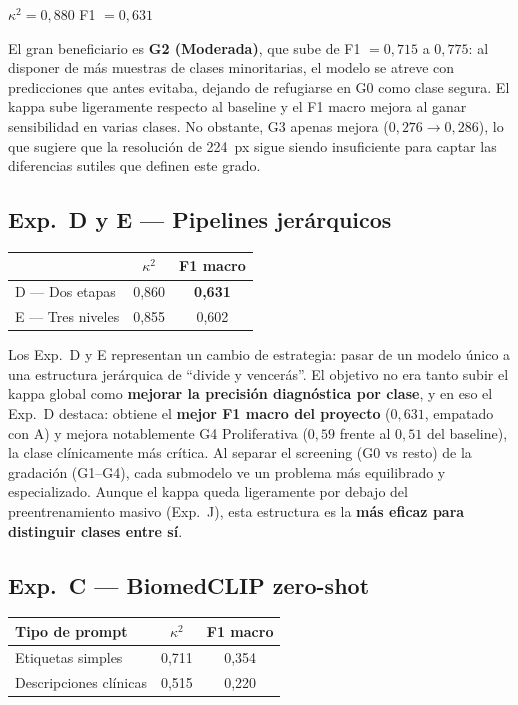 \documentclass[12pt, a4paper]{article}
\begin{document}
$\kappa^2 = 0{,}880$ \quad F1 $= 0{,}631$

El gran beneficiario es \textbf{G2 (Moderada)}, que sube de F1 $= 0{,}715$
a $0{,}775$: al disponer de más muestras de clases minoritarias, el modelo
se atreve con predicciones que antes evitaba, dejando de refugiarse en G0
como clase segura. El kappa sube ligeramente respecto al baseline y el F1
macro mejora al ganar sensibilidad en varias clases. No obstante, G3 apenas
mejora ($0{,}276 \to 0{,}286$), lo que sugiere que la resolución de 224~px
sigue siendo insuficiente para captar las diferencias sutiles que definen
este grado.

\subsection{Exp.~D y E --- Pipelines jerárquicos}

\begin{tabular}{lcc}
\toprule
& $\kappa^2$ & F1 macro \\ \midrule
D --- Dos etapas    & 0,860 & \textbf{0,631} \\
E --- Tres niveles  & 0,855 & 0,602 \\ \bottomrule
\end{tabular}

\vspace{6pt}
Los Exp.~D y E representan un cambio de estrategia: pasar de un modelo
único a una estructura jerárquica de ``divide y vencerás''. El objetivo
no era tanto subir el kappa global como \textbf{mejorar la precisión
diagnóstica por clase}, y en eso el Exp.~D destaca: obtiene el
\textbf{mejor F1 macro del proyecto} ($0{,}631$, empatado con A) y mejora
notablemente G4 Proliferativa ($0{,}59$ frente al $0{,}51$ del
baseline), la clase clínicamente más crítica. Al separar el screening
(G0 vs resto) de la gradación (G1--G4), cada submodelo ve un problema
más equilibrado y especializado. Aunque el kappa queda ligeramente por
debajo del preentrenamiento masivo (Exp.~J), esta estructura es la
\textbf{más eficaz para distinguir clases entre sí}.

\subsection{Exp.~C --- BiomedCLIP zero-shot}

\begin{tabular}{lcc}
\toprule
\textbf{Tipo de prompt} & $\kappa^2$ & F1 macro \\ \midrule
Etiquetas simples     & 0,711 & 0,354 \\
Descripciones clínicas & 0,515 & 0,220 \\ \bottomrule
\end{tabular}
\end{document}
